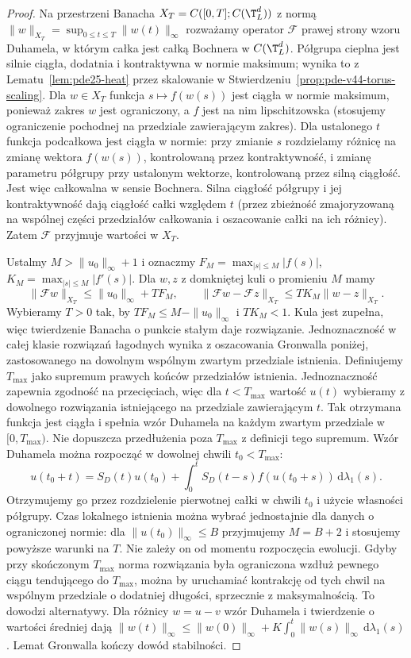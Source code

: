 \begin{proof}
Na przestrzeni Banacha $X_T=C([0,T];C(\T_L^d))$
z normą $\|w\|_{X_T}=\sup_{0\le t\le T}\|w(t)\|_\infty$
rozważamy operator $\mathcal F$ prawej strony wzoru Duhamela,
w którym całka jest całką Bochnera w $C(\T_L^d)$.
Półgrupa cieplna jest silnie ciągła, dodatnia
i kontraktywna w normie maksimum; wynika to
z Lematu~\ref{lem:pde25-heat} przez skalowanie
w Stwierdzeniu~\ref{prop:pde-v44-torus-scaling}.
Dla $w\in X_T$ funkcja $s\mapsto f(w(s))$ jest ciągła
w normie maksimum, ponieważ zakres $w$ jest ograniczony,
a $f$ jest na nim lipschitzowska (stosujemy ograniczenie
pochodnej na przedziale zawierającym zakres).
Dla ustalonego $t$ funkcja podcałkowa jest ciągła
w normie: przy zmianie $s$ rozdzielamy różnicę na
zmianę wektora $f(w(s))$, kontrolowaną przez
kontraktywność, i zmianę parametru półgrupy
przy ustalonym wektorze, kontrolowaną przez
silną ciągłość. Jest więc całkowalna w sensie Bochnera.
Silna ciągłość półgrupy i jej kontraktywność dają
ciągłość całki względem $t$ (przez zbieżność
zmajoryzowaną na wspólnej części przedziałów całkowania
i oszacowanie całki na ich różnicy).
Zatem $\mathcal F$ przyjmuje wartości w $X_T$.

Ustalmy $M>\|u_0\|_\infty+1$ i oznaczmy
$F_M=\max_{|s|\le M}|f(s)|$, $K_M=\max_{|s|\le M}|f'(s)|$.
Dla $w,z$ z domkniętej kuli o promieniu $M$ mamy
\[
 \|\mathcal Fw\|_{X_T}\le\|u_0\|_\infty+TF_M,\qquad
 \|\mathcal Fw-\mathcal Fz\|_{X_T}
 \le TK_M\|w-z\|_{X_T}.
\]
Wybieramy $T>0$ tak, by $TF_M\le M-\|u_0\|_\infty$
i $TK_M<1$. Kula jest zupełna, więc twierdzenie
Banacha o punkcie stałym daje rozwiązanie.
Jednoznaczność w całej klasie rozwiązań łagodnych
wynika z oszacowania Gronwalla poniżej, zastosowanego
na dowolnym wspólnym zwartym przedziale istnienia.
Definiujemy $T_{\max}$ jako supremum prawych
końców przedziałów istnienia. Jednoznaczność
zapewnia zgodność na przecięciach, więc dla
$t<T_{\max}$ wartość $u(t)$ wybieramy z dowolnego
rozwiązania istniejącego na przedziale zawierającym $t$.
Tak otrzymana funkcja jest ciągła i spełnia wzór
Duhamela na każdym zwartym przedziale w $[0,T_{\max})$.
Nie dopuszcza przedłużenia poza $T_{\max}$ z definicji
tego supremum.
Wzór Duhamela można rozpocząć w dowolnej chwili
$t_0<T_{\max}$:
\[
 u(t_0+t)=S_D(t)u(t_0)+
 \int_0^t S_D(t-s)f(u(t_0+s))\,\mathrm d\lambda_1(s).
\]
Otrzymujemy go przez rozdzielenie pierwotnej całki
w chwili $t_0$ i użycie własności półgrupy.
Czas lokalnego istnienia można wybrać jednostajnie
dla danych o ograniczonej normie: dla
$\|u(t_0)\|_\infty\le B$ przyjmujemy $M=B+2$
i stosujemy powyższe warunki na $T$.
Nie zależy on od momentu rozpoczęcia ewolucji. Gdyby przy skończonym $T_{\max}$
norma rozwiązania była ograniczona wzdłuż pewnego ciągu
tendującego do $T_{\max}$, można by uruchamiać kontrakcję
od tych chwil na wspólnym przedziale o dodatniej długości,
sprzecznie z maksymalnością. To dowodzi alternatywy.
Dla różnicy $w=u-v$ wzór Duhamela i twierdzenie o wartości
średniej dają
$\|w(t)\|_\infty\le\|w(0)\|_\infty+
K\int_0^t\|w(s)\|_\infty\,\mathrm d\lambda_1(s)$.
Lemat Gronwalla kończy dowód stabilności.
\end{proof}


